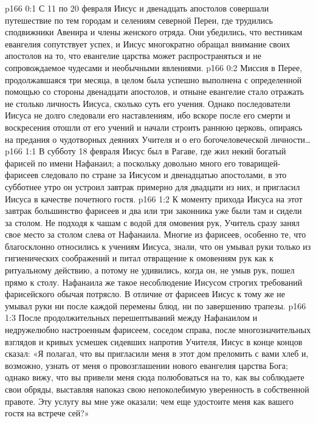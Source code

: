 \author{Комиссия срединников}
\vs p166 0:1 С 11 по 20 февраля Иисус и двенадцать апостолов совершали путешествие по тем городам и селениям северной Переи, где трудились сподвижники Авенира и члены женского отряда. Они убедились, что вестникам евангелия сопутствует успех, и Иисус многократно обращал внимание своих апостолов на то, что евангелие царства может распространяться и не сопровождаемое чудесами и необычными явлениями.
\vs p166 0:2 Миссия в Перее, продолжавшаяся три месяца, в целом была успешно выполнена с определенной помощью со стороны двенадцати апостолов, и отныне евангелие стало отражать не столько личность Иисуса, сколько суть его учения. Однако последователи Иисуса не долго следовали его наставлениям, ибо вскоре после его смерти и воскресения отошли от его учений и начали строить раннюю церковь, опираясь на предания о чудотворных деяниях Учителя и о его богочеловеческой личности\ldots
{}
\vs p166 1:1 В субботу 18 февраля Иисус был в Рагаве, где жил некий богатый фарисей по имени Нафанаил; а поскольку довольно много его товарищей\hyp{}фарисеев следовало по стране за Иисусом и двенадцатью апостолами, в это субботнее утро он устроил завтрак примерно для двадцати из них, и пригласил Иисуса в качестве почетного гостя.
\vs p166 1:2 К моменту прихода Иисуса на этот завтрак большинство фарисеев и два или три законника уже были там и сидели за столом. Не подходя к чашам с водой для омовения рук, Учитель сразу занял свое место за столом слева от Нафанаила. Многие из фарисеев, особенно те, что благосклонно относились к учениям Иисуса, знали, что он умывал руки только из гигиенических соображений и питал отвращение к омовениям рук как к ритуальному действию, а потому не удивились, когда он, не умыв рук, пошел прямо к столу. Нафанаила же такое несоблюдение Иисусом строгих требований фарисейского обычая потрясло. В отличие от фарисеев Иисус к тому же не умывал руки ни после каждой перемены блюд, ни по завершению трапезы.
\vs p166 1:3 После продолжительных перешептываний между Нафанаилом и недружелюбно настроенным фарисеем, соседом справа, после многозначительных взглядов и кривых усмешек сидевших напротив Учителя, Иисус в конце концов сказал: «Я полагал, что вы пригласили меня в этот дом преломить с вами хлеб и, возможно, узнать от меня о провозглашении нового евангелия царства Бога; однако вижу, что вы привели меня сюда полюбоваться на то, как вы соблюдаете свои обряды, выставляя напоказ свою непоколебимую уверенность в собственной правоте. Эту услугу вы мне уже оказали; чем еще удостоите меня как вашего гостя на встрече сей?»
